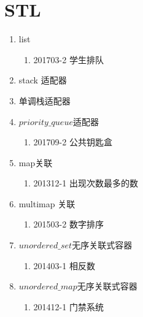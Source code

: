 \documentclass[cn,11pt,chinese]{elegantbook}
\begin{document}
\chapter{STL}
\begin{introduction}[本人完成的题目]
  \item 
  \begin{enumerate}[\Roman*]
      \item list
   \begin{enumerate}[\arabic*]
       \item 201703-2 学生排队
   \end{enumerate}
\item stack 适配器
\item 单调栈适配器
\item $priority\_queue$适配器
    \begin{enumerate}[\arabic*]
       \item 201709-2 公共钥匙盒
   \end{enumerate}
\item map关联
    \begin{enumerate}[\arabic*]
      \item 201312-1 出现次数最多的数
   \end{enumerate}
\item multimap 关联
    \begin{enumerate}[\arabic*]
      \item 201503-2 数字排序
    \end{enumerate}
\item $unordered\_set$无序关联式容器
  \begin{enumerate}[\arabic*]
    \item 201403-1 相反数
  \end{enumerate}
\item $unordered\_map$无序关联式容器
  \begin{enumerate}[\arabic*]
    \item 201412-1 门禁系统
  \end{enumerate}
  \end{enumerate}
\end{introduction}






\end{document}

